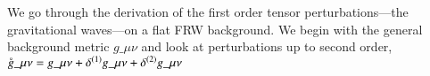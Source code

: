 



\newcommand{\pert}{\ALIASpert}



We go through the derivation of the first order tensor perturbations---the gravitational waves---on a flat FRW background. We begin with the general background metric $g\_{\mu\nu}$ and look at perturbations up to second order, $\pert{g}\_{\mu\nu}=g\_{\mu\nu} + \delta^{(1)}g\_{\mu\nu}+\delta^{(2)}g\_{\mu\nu}$ 

\citep{jokelaGravitationalWaveMemory2022}